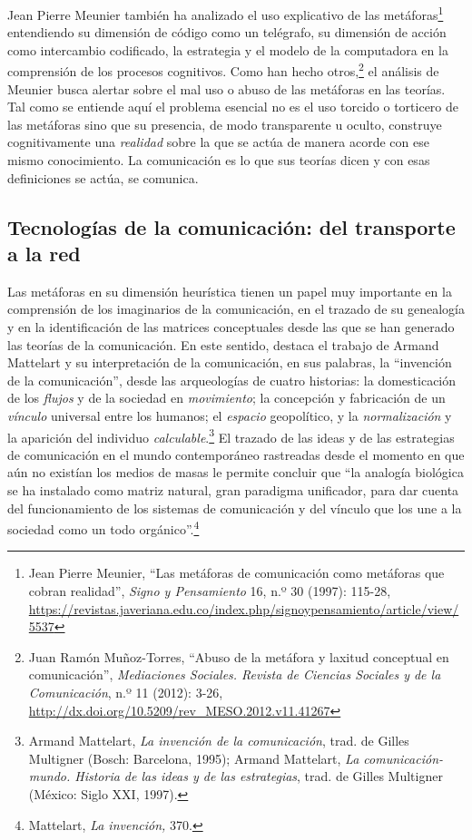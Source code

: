 \documentclass{tufte-handout}
\begin{document}
Jean Pierre Meunier también ha analizado el uso explicativo de las
metáforas\footnote{Jean Pierre Meunier, ``Las metáforas de comunicación
  como metáforas que cobran realidad'', \emph{Signo y Pensamiento} 16,
  n.º 30 (1997): 115-28,
  \url{https://revistas.javeriana.edu.co/index.php/signoypensamiento/article/view/5537}}
entendiendo su dimensión de código como un telégrafo, su dimensión de
acción como intercambio codificado, la estrategia y el modelo de la
computadora en la comprensión de los procesos cognitivos. Como han hecho
otros,\footnote{Juan Ramón Muñoz-Torres, ``Abuso de la metáfora y
  laxitud conceptual en comunicación'', \emph{Mediaciones Sociales.
  Revista de Ciencias Sociales y de la Comunicación}, n.º 11 (2012):
  3-26, \url{http://dx.doi.org/10.5209/rev_MESO.2012.v11.41267}} el
análisis de Meunier busca alertar sobre el mal uso o abuso de las
metáforas en las teorías. Tal como se entiende aquí el problema esencial
no es el uso torcido o torticero de las metáforas sino que su presencia,
de modo transparente u oculto, construye cognitivamente una
\emph{realidad} sobre la que se actúa de manera acorde con ese mismo
conocimiento. La comunicación es lo que sus teorías dicen y con esas
definiciones se actúa, se comunica.

\hypertarget{tecnologas-de-la-comunicacin-del-transporte-a-la-red}{%
\subsection{Tecnologías de la comunicación: del
transporte a la
red}\label{tecnologas-de-la-comunicacin-del-transporte-a-la-red}}

Las metáforas en su dimensión heurística tienen un papel muy importante
en la comprensión de los imaginarios de la comunicación, en el trazado
de su genealogía y en la identificación de las matrices conceptuales
desde las que se han generado las teorías de la comunicación. En este
sentido, destaca el trabajo de Armand Mattelart y su interpretación de
la comunicación, en sus palabras, la ``invención de la comunicación'',
desde las arqueologías de cuatro historias: la domesticación de los
\emph{flujos} y de la sociedad en \emph{movimiento}; la concepción y
fabricación de un \emph{vínculo} universal entre los humanos; el
\emph{espacio} geopolítico, y la \emph{normalización} y la aparición del
individuo \emph{calculable}.\footnote{Armand Mattelart, \emph{La
  invención de la comunicación}, trad. de Gilles Multigner (Bosch:
  Barcelona, 1995); Armand Mattelart, \emph{La comunicación-mundo.
  Historia de las ideas y de las estrategias}, trad. de Gilles Multigner
  (México: Siglo XXI, 1997).} El trazado de las ideas y de las
estrategias de comunicación en el mundo contemporáneo rastreadas desde
el momento en que aún no existían los medios de masas le permite
concluir que ``la analogía biológica se ha instalado como matriz
natural, gran paradigma unificador, para dar cuenta del funcionamiento
de los sistemas de comunicación y del vínculo que los une a la sociedad
como un todo orgánico''.\footnote{Mattelart, \emph{La invención,} 370.}
\end{document}
